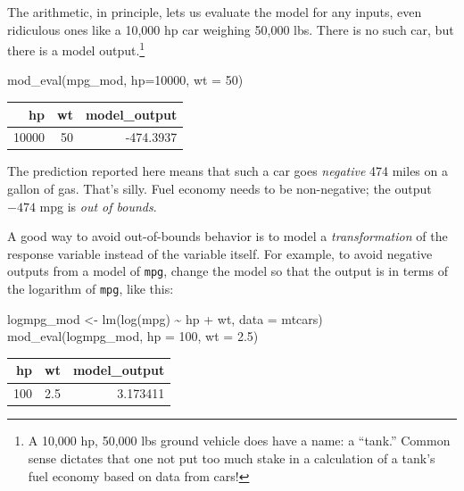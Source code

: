 \documentclass[
  letterpaper,
  DIV=11,
  numbers=noendperiod,
  oneside]{scrreprt}
\newenvironment{Shaded}{\begin{snugshade}}{\end{snugshade}}
\newcommand{\AttributeTok}[1]{\textcolor[rgb]{0.40,0.45,0.13}{#1}}
\newcommand{\DecValTok}[1]{\textcolor[rgb]{0.68,0.00,0.00}{#1}}
\newcommand{\FloatTok}[1]{\textcolor[rgb]{0.68,0.00,0.00}{#1}}
\newcommand{\FunctionTok}[1]{\textcolor[rgb]{0.28,0.35,0.67}{#1}}
\newcommand{\NormalTok}[1]{\textcolor[rgb]{0.00,0.23,0.31}{#1}}
\newcommand{\OtherTok}[1]{\textcolor[rgb]{0.00,0.23,0.31}{#1}}
\newcommand{\SpecialCharTok}[1]{\textcolor[rgb]{0.37,0.37,0.37}{#1}}
\begin{document}
{\begin{footnotesize}
The arithmetic, in principle, lets us evaluate the model for any inputs,
even ridiculous ones like a 10,000 hp car weighing 50,000 lbs. There is
no such car, but there is a model output.\footnote{A 10,000 hp, 50,000
  lbs ground vehicle does have a name: a ``tank.'' Common sense dictates
  that one not put too much stake in a calculation of a tank's fuel
  economy based on data from cars!}

\begin{Shaded}
\begin{Highlighting}[]
\FunctionTok{mod\_eval}\NormalTok{(mpg\_mod, }\AttributeTok{hp=}\DecValTok{10000}\NormalTok{, }\AttributeTok{wt =} \DecValTok{50}\NormalTok{)}
\end{Highlighting}
\end{Shaded}

\ttfamily 
\begin{tabular}{rrr}
\toprule
hp & wt & model\_output\\
\midrule
10000 & 50 & -474.3937\\
\bottomrule
\end{tabular} \normalfont
\bigskip

The prediction reported here means that such a car goes \emph{negative}
474 miles on a gallon of gas. That's silly. Fuel economy needs to be
non-negative; the output \(-474\) mpg is \emph{out of bounds}.

A good way to avoid out-of-bounds behavior is to model a
\emph{transformation} of the response variable instead of the variable
itself. For example, to avoid negative outputs from a model of
\texttt{mpg}, change the model so that the output is in terms of the
logarithm of \texttt{mpg}, like this:

\begin{Shaded}
\begin{Highlighting}[]
\NormalTok{logmpg\_mod }\OtherTok{\textless{}{-}} \FunctionTok{lm}\NormalTok{(}\FunctionTok{log}\NormalTok{(mpg) }\SpecialCharTok{\textasciitilde{}}\NormalTok{ hp }\SpecialCharTok{+}\NormalTok{ wt, }\AttributeTok{data =}\NormalTok{ mtcars) }
\FunctionTok{mod\_eval}\NormalTok{(logmpg\_mod, }\AttributeTok{hp =} \DecValTok{100}\NormalTok{, }\AttributeTok{wt =} \FloatTok{2.5}\NormalTok{)}
\end{Highlighting}
\end{Shaded}

\ttfamily 
\begin{tabular}{rrr}
\toprule
hp & wt & model\_output\\
\midrule
100 & 2.5 & 3.173411\\
\bottomrule
\end{tabular} \normalfont
\bigskip


\end{footnotesize}}
\end{document}
